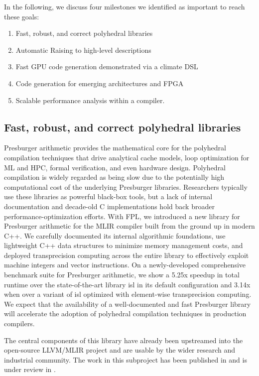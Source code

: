 \documentclass[11pt, manuscript,\review anonymous]{acmart}
\begin{document}
In the following, we discuss four milestones we identified as important to
reach these goals:

\begin{enumerate}
\item Fast, robust, and correct polyhedral libraries
\item Automatic Raising to high-level descriptions
\item Fast GPU code generation demonstrated via a climate DSL
\item Code generation for emerging architectures and FPGA
\item Scalable performance analysis within a compiler.
\end{enumerate}


\subsection{Fast, robust, and correct polyhedral libraries}
Presburger arithmetic provides the mathematical core for the polyhedral
compilation techniques that drive analytical cache models, loop optimization
for ML and HPC, formal verification, and even hardware design.  Polyhedral
compilation is widely regarded as being slow due to the potentially high
computational cost of the underlying Presburger libraries. Researchers
typically use these libraries as powerful black-box tools, but a lack of
internal documentation and decade-old C implementations hold back broader
performance-optimization efforts. With FPL, we introduced a new library for
Presburger arithmetic for the MLIR compiler built from the ground up in modern
C++. We carefully documented its internal algorithmic foundations, use
lightweight C++ data structures to minimize memory management costs, and deployed
transprecision computing across the entire library to effectively exploit
machine integers and vector instructions. On a newly-developed comprehensive
benchmark suite for Presburger arithmetic, we show a 5.25x speedup in total
runtime over the state-of-the-art library isl in its default configuration and
3.14x when over a variant of isl optimized with element-wise transprecision
computing. We expect that the availability of a well-documented and fast
Presburger library will accelerate the adoption of polyhedral compilation
techniques in production compilers.

The central components of this library have already been upstreamed into the
open-source LLVM/MLIR project and are usable by the wider research and 
industrial community. The work in this subproject has been published in \citet{grosser2020fast} and
is under review in \citet{pichanatan2021}.
\end{document}
